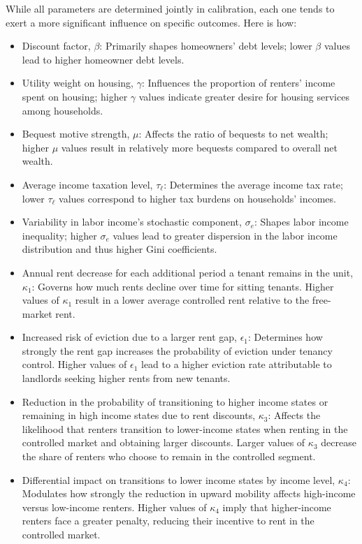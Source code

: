 \documentclass[parskip=full]{article}
\begin{document}
While all parameters are determined jointly in calibration, each one tends to exert a more significant influence on specific outcomes. Here is how:
\begin{itemize}
    \item Discount factor, $\beta$: Primarily shapes homeowners' debt levels; lower $\beta$ values lead to higher homeowner debt levels.
    \item Utility weight on housing, $\gamma$: Influences the proportion of renters' income spent on housing; higher $\gamma$ values indicate greater desire for housing services among households.
    \item Bequest motive strength, $\mu$: Affects the ratio of bequests to net wealth; higher $\mu$ values result in relatively more bequests compared to overall net wealth.
    \item Average income taxation level, $\tau_{\ell}$: Determines the average income tax rate; lower $\tau_{\ell}$ values correspond to higher tax burdens on households' incomes.
    \item Variability in labor income's stochastic component, $\sigma_{e}$: Shapes labor income inequality; higher $\sigma_{e}$ values lead to greater dispersion in the labor income distribution and thus higher Gini coefficients.
    \item Annual rent decrease for each additional period a tenant remains in the unit, $\kappa_1$: Governs how much rents decline over time for sitting tenants. Higher values of $\kappa_1$ result in a lower average controlled rent relative to the free-market rent.    
    \item Increased risk of eviction due to a larger rent gap, $\epsilon_1$: Determines how strongly the rent gap increases the probability of eviction under tenancy control. Higher values of $\epsilon_1$ lead to a higher eviction rate attributable to landlords seeking higher rents from new tenants.
    \item Reduction in the probability of transitioning to higher income states or remaining in high income states due to rent discounts, $\kappa_3$: Affects the likelihood that renters transition to lower-income states when renting in the controlled market and obtaining larger discounts. Larger values of $\kappa_3$ decrease the share of renters who choose to remain in the controlled segment.
    \item Differential impact on transitions to lower income states by income level, $\kappa_4$: Modulates how strongly the reduction in upward mobility affects high-income versus low-income renters. Higher values of $\kappa_4$ imply that higher-income renters face a greater penalty, reducing their incentive to rent in the controlled market.

\end{itemize}
\end{document}

